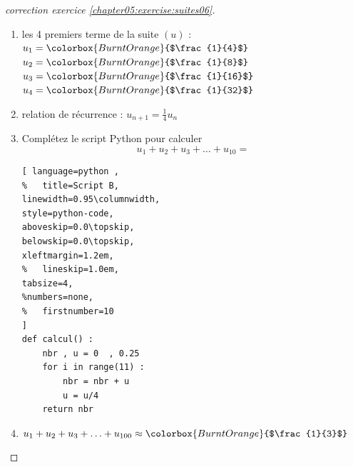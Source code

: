 \documentclass[main.tex]{subfiles}
\begin{document}
\begin{proof}[correction exercice \ref{chapter05:exercise:suites06}] \hfill 
	
\noindent
\begin{minipage}{0.62\linewidth} 
\begin{enumerate}[label=\arabic*),leftmargin=*]
	\item   les 4 premiers terme de la suite $(u)$ :\\
	$u_1=\colorbox{BurntOrange}{$\frac{1}{4}$}$\dotfill $u_2=\colorbox{BurntOrange}{$\frac{1}{8}$}$\dotfill $u_3=\colorbox{BurntOrange}{$\frac{1}{16}$}$\dotfill $u_4=\colorbox{BurntOrange}{$\frac{1}{32}$}$\dotfill 
	\item  relation de récurrence : \colorbox{BurntOrange}{$u_{n+1}=\frac{1}{4}u_n$} 
	\item Complétez le script Python pour calculer 
	\setlength{\abovedisplayskip}{3pt}
	\setlength{\belowdisplayskip}{3pt}
$$u_1+u_2+u_3+\ldots+u_{10}=$$	
\begin{lstlisting}[ language=python , 
%	title=Script B,   
linewidth=0.95\columnwidth,
style=python-code,    
aboveskip=0.0\topskip,
belowskip=0.0\topskip,
xleftmargin=1.2em,
%	lineskip=1.0em,
tabsize=4, 
%numbers=none,
%	firstnumber=10  
] 
def calcul() :
	nbr , u = 0  , 0.25
	for i in range(11) :
		nbr = nbr + u
		u = u/4
	return nbr
\end{lstlisting}
	\item  
	$u_1+u_2+u_3+\ldots +u_{100}\approx \colorbox{BurntOrange}{$\frac{1}{3}$} $
\end{enumerate}	 
\end{minipage} 
\hfill 
\begin{minipage}{0.35\linewidth} 
\end{minipage}
\end{proof}
\end{document}
